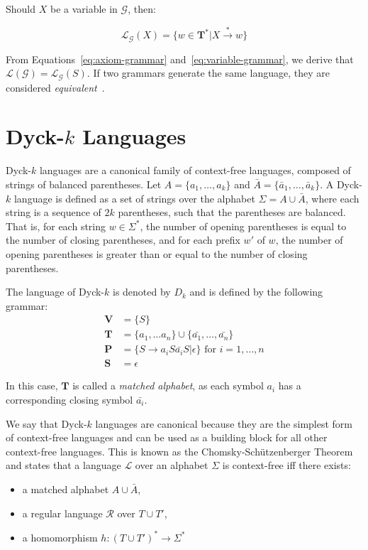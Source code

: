 Should $X$ be a variable in $\mathcal{G}$, then:

\begin{equation}\label{eq:variable-grammar}
\mathcal{L}_{\mathcal{G}}(X) = \{ w \in \mathbf{T}^* | X \xrightarrow{*} w\}
\end{equation}

From Equations~\ref{eq:axiom-grammar} and~\ref{eq:variable-grammar}, we derive that $\mathcal{L}(\mathcal{G}) = \mathcal{L}_{\mathcal{G}}(S)$. If two grammars generate the same language, they are considered \emph{equivalent}~\cite{leeuwen-cfg}.

\section{Dyck-$k$ Languages} \label{section:dyck_k}
Dyck-$k$ languages are a canonical family of context-free languages, composed of strings of balanced parentheses.
Let $A = \{ a_1, \dots, a_k \}$ and $\bar{A} = \{ \bar{a}_1, \dots, \bar{a}_k \}$. 
A Dyck-$k$ language is defined as a set of strings over the alphabet $\Sigma = A \cup \bar{A}$, where each string is a sequence of $2k$ parentheses, such that the parentheses are balanced. 
That is, for each string $w \in \Sigma^*$, the number of opening parentheses is equal to the number of closing parentheses, and for each prefix $w'$ of $w$, the number of opening parentheses is greater than or equal to the number of closing parentheses.

The language of Dyck-$k$ is denoted by $D_k$ and is defined by the following grammar:
\begin{align*}
    \mathbf{V} &= \{S\} \\
    \mathbf{T} &= \{a_1, \dots a_n\} \cup \{ \bar{a_1}, \dots, \bar{a_n} \}\\
    \mathbf{P} &= \{ S \rightarrow a_i S \bar{a_i} S | \epsilon \} \text{ for } i = 1, \dots, n \\
    \mathbf{S} &= \epsilon
\end{align*}

In this case, $\mathbf{T}$ is called a \emph{matched alphabet}, as each symbol $a_i$ has a corresponding closing symbol $\bar{a_i}$.

We say that Dyck-$k$ languages are canonical because they are the simplest form of context-free languages and can be used as a building block 
for all other context-free languages. This is known as the Chomsky-Sch{\"u}tzenberger Theorem \cite{rozenberg1997handbook} and states that a language $\mathcal{L}$ over an alphabet $\Sigma$ is context-free iff there exists:
\begin{itemize}
    \item a matched alphabet $A \cup \bar{A}$,
    \item a regular language $\mathcal{R}$ over $T \cup T'$,
    \item a homomorphism $h: {(T \cup T')}^* \rightarrow \Sigma^*$
\end{itemize}

